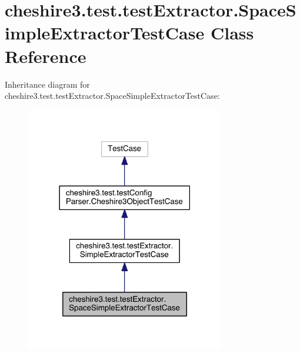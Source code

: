 \hypertarget{classcheshire3_1_1test_1_1test_extractor_1_1_space_simple_extractor_test_case}{\section{cheshire3.\-test.\-test\-Extractor.\-Space\-Simple\-Extractor\-Test\-Case Class Reference}
\label{classcheshire3_1_1test_1_1test_extractor_1_1_space_simple_extractor_test_case}
}


Inheritance diagram for cheshire3.\-test.\-test\-Extractor.\-Space\-Simple\-Extractor\-Test\-Case\-:
\nopagebreak
\begin{figure}[H]
\begin{center}
\leavevmode
\includegraphics[width=246pt]{classcheshire3_1_1test_1_1test_extractor_1_1_space_simple_extractor_test_case__inherit__graph}
\end{center}
\end{figure}


